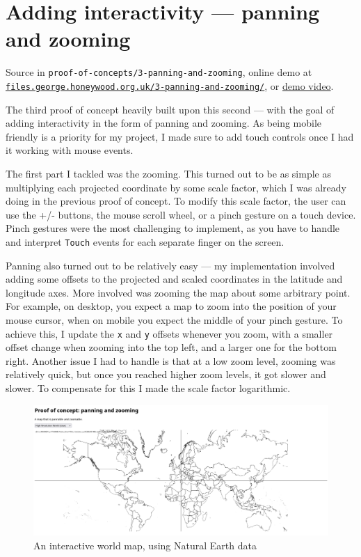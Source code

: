\documentclass{final_report}
\begin{document}
\section{Adding interactivity --- panning and zooming}

{ \footnotesize Source in \texttt{proof-of-concepts/3-panning-and-zooming}, online demo at \href{https://files.george.honeywood.org.uk/3-panning-and-zooming/}{\nolinkurl{files.george.honeywood.org.uk/3-panning-and-zooming/}}, or \href{https://youtu.be/_JvGwLra_Q4}{demo video}.}

The third proof of concept heavily built upon this second --- with the goal of adding interactivity in the form of panning and zooming. As being mobile friendly is a priority for my project, I made sure to add touch controls once I had it working with mouse events.

The first part I tackled was the zooming. This turned out to be as simple as multiplying each projected coordinate by some scale factor, which I was already doing in the previous proof of concept. To modify this scale factor, the user can use the +/- buttons, the mouse scroll wheel, or a pinch gesture on a touch device. Pinch gestures were the most challenging to implement, as you have to handle and interpret \texttt{Touch} events for each separate finger on the screen.

Panning also turned out to be relatively easy --- my implementation involved adding some offsets to the projected and scaled coordinates in the latitude and longitude axes. More involved was zooming the map about some arbitrary point. For example, on desktop, you expect a map to zoom into the position of your mouse cursor, when on mobile you expect the middle of your pinch gesture. To achieve this, I update the \texttt{x} and \texttt{y} offsets whenever you zoom, with a smaller offset change when zooming into the top left, and a larger one for the bottom right. Another issue I had to handle is that at a low zoom level, zooming was relatively quick, but once you reached higher zoom levels, it got slower and slower. To compensate for this I made the scale factor logarithmic.

\begin{figure}[ht]
    \centering
    \includegraphics[width=\textwidth]{../proof-of-concepts/3-panning-and-zooming/screenshots/the-world.png}
    \caption{An interactive world map, using Natural Earth data~\cite{natural-earth}}\label{fig:panning-and-zooming}
\end{figure}
\end{document}
